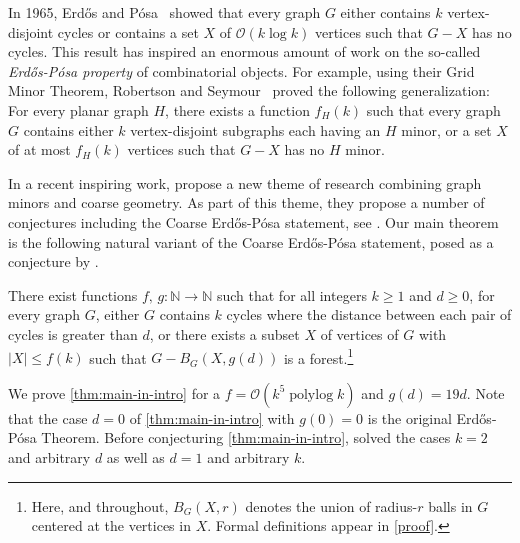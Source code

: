 \documentclass{patmorin}
\DeclareMathOperator{\polylog}{polylog}
\newcommand{\Oh}{\mathcal{O}}
\begin{document}
In 1965, Erdős and Pósa~\cite{EP1965} showed that every graph $G$ 
either contains $k$ vertex-disjoint cycles 
or contains a set $X$ of $\Oh(k\log k)$ vertices such that $G-X$ has no cycles. 
This result has inspired an enormous amount of work on the so-called \emph{Erdős-Pósa property} of combinatorial objects. 
For example, using their Grid Minor Theorem, Robertson and Seymour~\cite{RS1986} proved the following generalization: For every planar graph $H$, there exists a function $f_H(k)$ such that every graph $G$ contains either $k$ vertex-disjoint subgraphs each having an $H$ minor, or a set $X$ of at most $f_H(k)$ vertices such that $G-X$ has no $H$ minor. 

In a recent inspiring work, \citet{GP23} propose a new theme of research combining graph minors and coarse geometry. 
As part of this theme, they propose a number of conjectures including the Coarse Erdős-Pósa statement, see \cite[Conjecture 9.7]{GP23}. Our main theorem is the following natural variant of the Coarse Erdős-Pósa statement, posed as a conjecture by \citet{ahn.gollin:coarse}.
\begin{thm}\label{thm:main-in-intro}
  There exist functions $f,\, g:\mathbb{N}\to\mathbb{N}$ such that for all integers $k\ge 1$ and $d\ge 0$, for every graph $G$,  either $G$ contains $k$ cycles where the distance between each pair of cycles is greater than $d$, or  there exists a subset $X$ of vertices of $G$ with $|X|\leq f(k)$ such that  $G-B_G(X,g(d))$ is a forest.\footnote{Here, and throughout, $B_G(X,r)$ denotes the union of radius-$r$ balls in $G$ centered at the vertices in $X$.  Formal definitions appear in \cref{proof}.}
\end{thm}
We prove \cref{thm:main-in-intro} for a $f=\Oh(k^5\polylog k)$ and $g(d)=19d$. 
Note that the case $d=0$ of \cref{thm:main-in-intro} with $g(0)=0$ is the original Erd\H{o}s-Pósa Theorem. 
Before conjecturing \cref{thm:main-in-intro}, \citet{ahn.gollin:coarse} solved the cases $k=2$ and arbitrary $d$ as well as $d=1$ and arbitrary $k$.  



\end{document}
